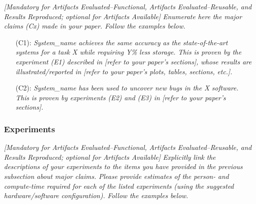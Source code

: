 \documentclass[sigconf]{acmart}
\begin{document}
	\emph{[Mandatory for \emph{Artifacts Evaluated--Functional},
		\emph{Artifacts Evaluated--Reusable}, and \emph{Results Reproduced};
		optional for \emph{Artifacts Available}]}
	\emph{Enumerate here the major claims (Cx) made in your paper.  Follow
		the examples below.}
	\bigskip
	
	\begin{itemize}
		\item[(C1):]
		\emph{System\_name achieves the same accuracy as the
			state-of-the-art systems for a task X while requiring Y\% less
			storage.  This is proven by the experiment (E1) described in [refer
			to your paper's sections], whose results are illustrated/reported
			in [refer to your paper's plots, tables, sections, etc.].}
		
		\item[(C2):]
		\emph{System\_name has been used to uncover new bugs in the X
			software.  This is proven by experiments (E2) and (E3) in [refer to
			your paper's sections].}
	\end{itemize}
	
	
	\subsubsection{Experiments}
	
	\emph{[Mandatory for \emph{Artifacts Evaluated--Functional},
		\emph{Artifacts Evaluated--Reusable}, and \emph{Results Reproduced};
		optional for \emph{Artifacts Available}]}
	\emph{Explicitly link the descriptions of your experiments to the
		items you have provided in the previous subsection about major claims.
		Please provide estimates of the person- and compute-time required for
		each of the listed experiments (using the suggested hardware/software
		configuration).  Follow the examples below.}
	
\end{document}
